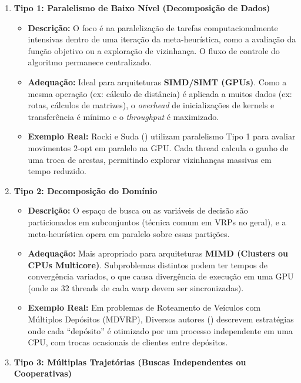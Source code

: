 \begin{enumerate}
\def\labelenumi{\arabic{enumi}.}
\tightlist
\item
  \textbf{Tipo 1: Paralelismo de Baixo Nível (Decomposição de Dados)}

  \begin{itemize}
  \tightlist
  \item
    \textbf{Descrição:} O foco é na paralelização de tarefas
    computacionalmente intensivas dentro de uma iteração da
    meta-heurística, como a avaliação da função objetivo ou a exploração
    de vizinhança. O fluxo de controle do algoritmo permanece
    centralizado.
  \item
    \textbf{Adequação:} Ideal para arquiteturas \textbf{SIMD/SIMT
    (GPUs)}. Como a mesma operação (ex: cálculo de distância) é aplicada
    a muitos dados (ex: rotas, cálculos de matrizes), o \emph{overhead}
    de inicializações de kernels e transferência é mínimo e o
    \emph{throughput} é maximizado.
  \item
    \textbf{Exemplo Real:} Rocki e Suda ()
    utilizam paralelismo Tipo 1 para avaliar movimentos \(2\)-opt em
    paralelo na GPU. Cada thread calcula o ganho de uma troca de
    arestas, permitindo explorar vizinhanças massivas em tempo reduzido.
  \end{itemize}
\item
  \textbf{Tipo 2: Decomposição do Domínio}

  \begin{itemize}
  \tightlist
  \item
    \textbf{Descrição:} O espaço de busca ou as variáveis de decisão são
    particionados em subconjuntos (técnica comum em VRPs no geral), e a
    meta-heurística opera em paralelo sobre essas partições.
  \item
    \textbf{Adequação:} Mais apropriado para arquiteturas \textbf{MIMD
    (Clusters ou CPUs Multicore)}. Subproblemas distintos podem ter
    tempos de convergência variados, o que causa divergência de execução
    em uma GPU (onde as 32 threads de cada warp devem ser
    sincronizadas).
  \item
    \textbf{Exemplo Real:} Em problemas de Roteamento de Veículos com
    Múltiplos Depósitos (MDVRP), Diversos autores
    () descrevem estratégias onde cada
    ``depósito'' é otimizado por um processo independente em uma CPU,
    com trocas ocasionais de clientes entre depósitos.
  \end{itemize}
\item
  \textbf{Tipo 3: Múltiplas Trajetórias (Buscas Independentes ou
  Cooperativas)}


\end{enumerate}
